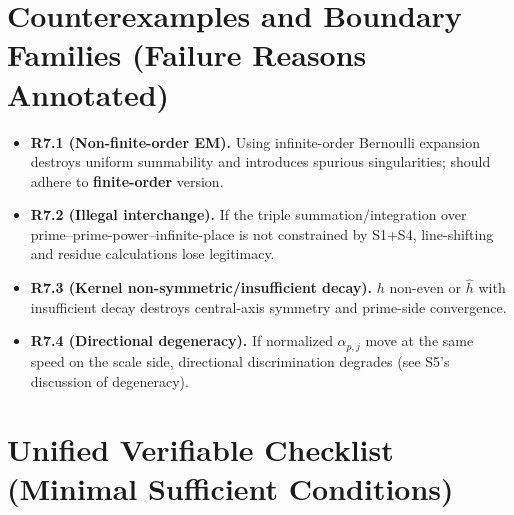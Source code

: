 \documentclass[11pt,a4paper]{article}
\theoremstyle{remark}
\begin{document}
\section{Counterexamples and Boundary Families (Failure Reasons Annotated)}

\begin{itemize}
\item \textbf{R7.1 (Non-finite-order EM).} Using infinite-order Bernoulli expansion destroys uniform summability and introduces spurious singularities; should adhere to \textbf{finite-order} version.

\item \textbf{R7.2 (Illegal interchange).} If the triple summation/integration over prime--prime-power--infinite-place is not constrained by S1+S4, line-shifting and residue calculations lose legitimacy.

\item \textbf{R7.3 (Kernel non-symmetric/insufficient decay).} $h$ non-even or $\widehat{h}$ with insufficient decay destroys central-axis symmetry and prime-side convergence.

\item \textbf{R7.4 (Directional degeneracy).} If normalized $\alpha_{p,j}$ move at the same speed on the scale side, directional discrimination degrades (see S5's discussion of degeneracy).
\end{itemize}

\section{Unified Verifiable Checklist (Minimal Sufficient Conditions)}
\end{document}
